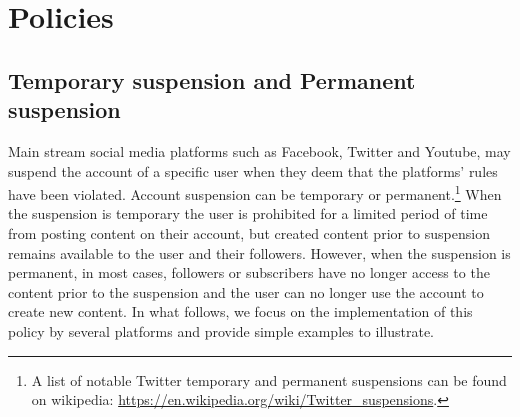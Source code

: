 \documentclass[11pt,a4paper]{article}
\begin{document}



%


\section{Policies}

\subsection{Temporary suspension and Permanent suspension}

Main stream social media platforms such as Facebook, Twitter and Youtube, may suspend the account of a specific user when they deem that the platforms' rules have been violated. Account suspension can be temporary or permanent.\footnote{A list of notable Twitter temporary and permanent suspensions can be found on wikipedia: \href{https://en.wikipedia.org/wiki/Twitter_suspensions}{https://en.wikipedia.org/wiki/Twitter\_suspensions}.}  When the suspension is temporary the user is prohibited for a limited period of time from posting content on their account, but created content prior to suspension remains available to the user and their followers. However, when the suspension is permanent, in most cases, followers or subscribers have no longer access to the content prior to the suspension and the user can no longer use the account to create new content.  In what follows, we focus on the implementation of this policy by several platforms and provide simple examples to illustrate. 
\end{document}
